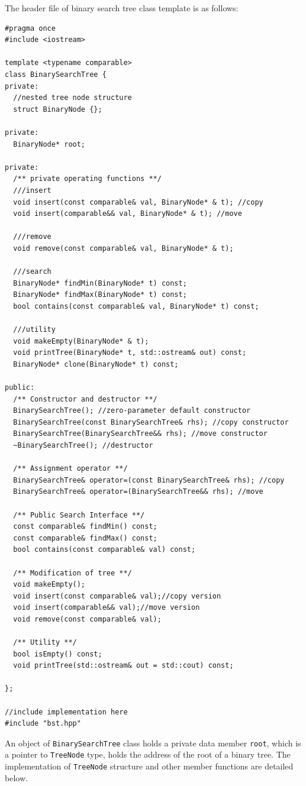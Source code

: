 \documentclass[12pt]{book}
\begin{document}
The header file of binary search tree class template is as follows:
\begin{verbatim}
#pragma once
#include <iostream>

template <typename comparable>
class BinarySearchTree {
private:
  //nested tree node structure
  struct BinaryNode {};

private:
  BinaryNode* root;

private:
  /** private operating functions **/
  ///insert 
  void insert(const comparable& val, BinaryNode* & t); //copy
  void insert(comparable&& val, BinaryNode* & t); //move

  ///remove
  void remove(const comparable& val, BinaryNode* & t);

  ///search 
  BinaryNode* findMin(BinaryNode* t) const;
  BinaryNode* findMax(BinaryNode* t) const;
  bool contains(const comparable& val, BinaryNode* t) const;

  ///utility
  void makeEmpty(BinaryNode* & t);
  void printTree(BinaryNode* t, std::ostream& out) const;
  BinaryNode* clone(BinaryNode* t) const;

public:
  /** Constructor and destructor **/
  BinarySearchTree(); //zero-parameter default constructor
  BinarySearchTree(const BinarySearchTree& rhs); //copy constructor
  BinarySearchTree(BinarySearchTree&& rhs); //move constructor
  ~BinarySearchTree(); //destructor

  /** Assignment operator **/
  BinarySearchTree& operator=(const BinarySearchTree& rhs); //copy
  BinarySearchTree& operator=(BinarySearchTree&& rhs); //move

  /** Public Search Interface **/
  const comparable& findMin() const;
  const comparable& findMax() const;
  bool contains(const comparable& val) const;

  /** Modification of tree **/
  void makeEmpty();
  void insert(const comparable& val);//copy version
  void insert(comparable&& val);//move version
  void remove(const comparable& val);

  /** Utility **/
  bool isEmpty() const;
  void printTree(std::ostream& out = std::cout) const;  

};

//include implementation here 
#include "bst.hpp"
\end{verbatim}

An object of \texttt{BinarySearchTree} class holds a private data member \texttt{root}, which is a pointer to \texttt{TreeNode} type, holds the address of the root of a binary tree. The implementation of \texttt{TreeNode} structure and other member functions are detailed below.
\end{document}
